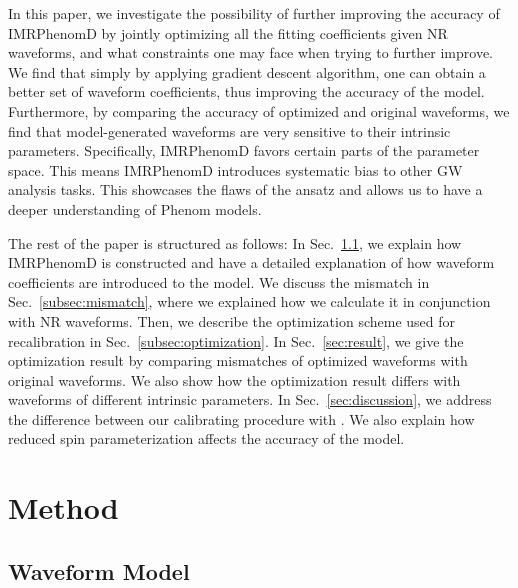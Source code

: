 \documentclass[twocolumn]{aastex631}
\newcommand{\kw}[1]{{\color{rb4}[KW: #1 ]}}
\begin{document}
In this paper, we investigate the possibility of further improving the accuracy of IMRPhenomD by jointly optimizing all the fitting coefficients given NR waveforms, and what constraints one may face when trying to further improve. We find that simply by applying gradient descent algorithm, one can obtain a better set of waveform coefficients, thus improving the accuracy of the model. Furthermore, by comparing the accuracy of optimized and original waveforms, we find that model-generated waveforms are very sensitive to their intrinsic parameters. Specifically, IMRPhenomD favors certain parts of the parameter space. This means IMRPhenomD introduces systematic bias to other GW analysis tasks. This showcases the flaws of the ansatz and allows us to have a deeper understanding of Phenom models.  

The rest of the paper is structured as follows: In Sec.~\ref{subsec:waveform_model}, we explain how IMRPhenomD is constructed and have a detailed explanation of how waveform coefficients are introduced to the model. We discuss the mismatch in Sec.~\ref{subsec:mismatch}, where we explained how we calculate it in conjunction with NR waveforms. Then, we describe the optimization scheme used for recalibration in Sec.~\ref{subsec:optimization}. In Sec.~\ref{sec:result}, we give the optimization result by comparing mismatches of optimized waveforms with original waveforms. We also show how the optimization result differs with waveforms of different intrinsic parameters. In Sec.~\ref{sec:discussion}, we address the difference between our calibrating procedure with \cite{khan2016frequency}. We also explain how reduced spin parameterization affects the accuracy of the model. 

\section{Method} \label{sec:method}

\subsection{Waveform Model} \label{subsec:waveform_model}
\end{document}
